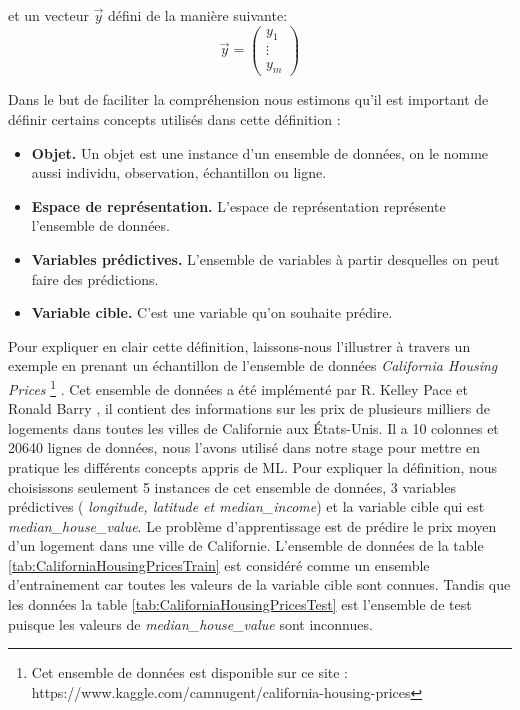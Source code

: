 \documentclass[12pt, french]{report}
\begin{document}
et un vecteur $\vec{y}$ défini de la manière suivante:
$$
\vec{y}=
\begin{pmatrix}
y_1\\
\vdots\\
y_m
\end{pmatrix}
$$ 

Dans le but de faciliter la compréhension nous estimons qu'il est important de définir certains concepts utilisés dans cette définition :
\begin{itemize}
	\item \textbf{Objet.} Un objet est une instance d'un ensemble de données, on le nomme aussi individu, observation, échantillon ou ligne.
	\item \textbf{Espace de représentation.} L'espace de représentation représente l'ensemble de données.
	\item \textbf{Variables prédictives.} L'ensemble de variables à partir desquelles on peut faire des prédictions.
	\item \textbf{Variable cible.} C'est une variable  qu'on souhaite prédire.
\end{itemize}

Pour expliquer en clair cette définition, laissons-nous l'illustrer à travers un exemple en prenant un échantillon de l'ensemble de données \guillemotleft \textit{California Housing Prices} \footnote{Cet ensemble de données est disponible sur ce site : https://www.kaggle.com/camnugent/california-housing-prices} \guillemotright. Cet ensemble de données a été implémenté par R. Kelley Pace et Ronald Barry \cite{key43}, il contient des informations sur les prix de plusieurs milliers de logements dans toutes les villes de Californie aux États-Unis. Il a 10 colonnes et 20640 lignes de données, nous l'avons utilisé dans notre stage pour mettre en pratique les différents concepts appris de ML.  Pour expliquer la définition, nous choisissons seulement 5 instances de cet ensemble de données, 3 variables prédictives ( \textit{longitude, latitude et median\_income}) et la variable cible qui est \textit{median\_house\_value}. Le problème d'apprentissage est de prédire le prix moyen d'un logement dans une ville de Californie. L'ensemble de données de la table \ref{tab:CaliforniaHousingPricesTrain} est considéré comme un ensemble d'entrainement car toutes les valeurs de la variable cible sont connues. Tandis que les données la table \ref{tab:CaliforniaHousingPricesTest} est l'ensemble de test puisque les valeurs de  \textit{median\_house\_value} sont inconnues.
   
\end{document}
